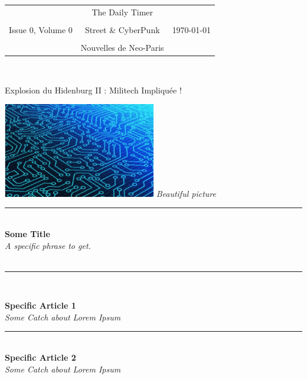 \documentclass[11pt,twoside,a4paper]{article}
\def\maketitle{%
	\setlength{\parindent}{0em}
	\begin{center}
		\begin{tabular}[c]{c|c|c}
								& \setmainfont{Sprawl} \Huge{The Daily Timer}						&			\\
								& 																	&			\\
			Issue 0, Volume 0 	& \setmainfont{Cyberpunk Is Not Dead} \Large{Street \& CyberPunk}	& \today	\\
								& 																	&			\\
								& Nouvelles de Neo-Paris											&			\\
		\end{tabular}~\\
	\end{center}
	\setlength{\parindent}{2\parskip}
}%
\begin{document}

\maketitle
\thispagestyle{empty}

\huge{\setmainfont{Cyberpunk Is Not Dead} Explosion du Hidenburg II : Militech Impliquée !}

\begin{multicols}{2}

\small

\includegraphics[width=0.50\textwidth]{../../images/62129055_10219405317945563_2140020562502615040_n.jpg}
{\centering \emph{Beautiful picture} } 

{\centering \rule{0.34\textwidth}{1pt} }~\\

\textbf{Some Title}~\\
\emph{A specific phrase to get. }~\\

\lipsum ~\\


{\centering \rule{0.34\textwidth}{1pt} }~\\

	\begin{multicols}{2}
	
		\textbf{Specific Article 1}~\\
		\emph{Some Catch about Lorem Ipsum}~\\
		
		\lipsum[1-5]
	
	\end{multicols}
	
	
	{\centering \rule{0.34\textwidth}{1pt} }~\\
	
	\textbf{Specific Article 2}~\\
	\emph{Some Catch about Lorem Ipsum}~\\
	
	\lipsum[2-5]

\end{multicols}
\end{document}
